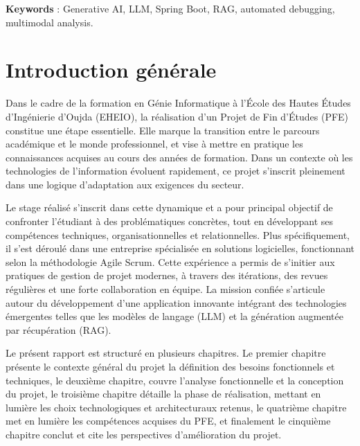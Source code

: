 \documentclass[12pt,a4paper]{report}
\begin{document}
	\textbf{Keywords} : Generative AI, LLM, Spring Boot, RAG, automated debugging, multimodal analysis.


	\clearpage
	\tableofcontents

	\clearpage
	\listoffigures
	
	
	\clearpage
	\listoftables
	
	\clearpage
	
	
	\chapter*{Introduction générale}
	
	Dans le cadre de la formation en Génie Informatique à l’École des Hautes Études d’Ingénierie d’Oujda (EHEIO), la réalisation d’un Projet de Fin d’Études (PFE) constitue une étape essentielle. Elle marque la transition entre le parcours académique et le monde professionnel, et vise à mettre en pratique les connaissances acquises au cours des années de formation. Dans un contexte où les technologies de l’information évoluent rapidement, ce projet s’inscrit pleinement dans une logique d’adaptation aux exigences du secteur.
	
	Le stage réalisé s’inscrit dans cette dynamique et a pour principal objectif de confronter l’étudiant à des problématiques concrètes, tout en développant ses compétences techniques, organisationnelles et relationnelles. Plus spécifiquement, il s’est déroulé dans une entreprise spécialisée en solutions logicielles, fonctionnant selon la méthodologie Agile Scrum. Cette expérience a permis de s’initier aux pratiques de gestion de projet modernes, à travers des itérations, des revues régulières et une forte collaboration en équipe. La mission confiée s’articule autour du développement d’une application innovante intégrant des technologies émergentes telles que les modèles de langage (LLM) et la génération augmentée par récupération (RAG).
	
	Le présent rapport est structuré en plusieurs chapitres. Le premier chapitre présente le contexte général du projet la définition des besoins fonctionnels et techniques, le deuxième chapitre, couvre l'analyse fonctionnelle et la conception du projet, le troisième chapitre détaille la phase de réalisation, mettant en lumière les choix technologiques et architecturaux retenus, le quatrième chapitre met en lumière les compétences acquises du PFE, et finalement le cinquième chapitre conclut et cite les perspectives d'amélioration du projet.
	
\end{document}
